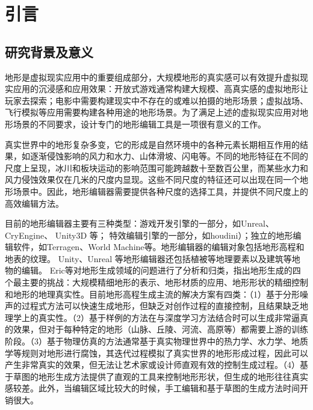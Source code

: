 
\chapter{引言}
\section{研究背景及意义}
地形是虚拟现实应用中的重要组成部分，大规模地形的真实感可以有效提升虚拟现实应用的沉浸感和应用效果：开放式游戏通常构建大规模、高真实感的虚拟地形让玩家去探索；电影中需要构建现实中不存在的或难以拍摄的地形场景；虚拟战场、飞行模拟等应用需要构建各种用途的地形场景。为了满足上述的虚拟现实应用对地形场景的不同要求，设计专门的地形编辑工具是一项很有意义的工作。\par
真实世界中的地形复杂多变，它的形成是自然环境中的各种元素长期相互作用的结果，如逐渐侵蚀影响的风力和水力、山体滑坡、闪电等。不同的地形特征在不同的尺度上呈现，冰川和板块运动的影响范围可能跨越数十至数百公里，而某些水力和风力侵蚀效果仅在几米的尺度内显现。这些不同尺度的特征还可以出现在同一个地形场景中。因此，地形编辑器需要提供各种尺度的选择工具，并提供不同尺度上的高效编辑方法。\par
目前的地形编辑器主要有三种类型：游戏开发引擎的一部分，如Unreal\supercite{unreal}、CryEngine\supercite{cry-engine}、 Unity3D \supercite{unity}等； 特效编辑引擎的一部分，如houdini\supercite{houdini}）；独立的地形编辑软件，如Terragen\supercite{terragen}、World Machine\supercite{world-machine}等。地形编辑器的编辑对象包括地形高程和地表的纹理。 Unity、Unreal 等地形编辑器还包括植被等地理要素以及建筑等地物的编辑。 Eric等\supercite{eric-review}对地形生成领域的问题进行了分析和归类，指出地形生成的四个最主要的挑战：大规模精细地形的表示、地形材质的应用、地形形状的精细控制和地形的地理真实性。目前地形高程生成主流的解决方案有四类：（1）基于分形噪声的过程式方法\supercite{Belhadj2007Terrain}可以快速生成地形，但缺乏对创作过程的直接控制，且结果缺乏地理学上的真实性。（2）基于样例的方法\supercite{TasseEnhanced}在与深度学习方法结合时可以生成非常逼真的效果，但对于每种特定的地形（山脉、丘陵、河流、高原等）都需要上游的训练阶段。（3）基于物理仿真的方法\supercite{Mei2007Fast}通常基于真实物理世界中的热力学、水力学、地质学等规则对地形进行腐蚀，其迭代过程模拟了真实世界的地形形成过程，因此可以产生非常真实的效果，但无法让艺术家或设计师直观有效的控制生成过程。（4）基于草图的地形生成方法\supercite{Zhou2007Terrain}提供了直观的工具来控制地形形状，但生成的地形往往真实感较差。此外，当编辑区域比较大的时候，手工编辑和基于草图的生成方法时间开销很大。\par
